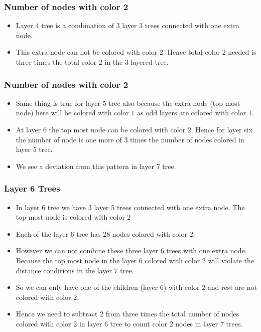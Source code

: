 \begin{frame}
    \frametitle{Number of nodes with color 2}

    \begin{itemize}
        \item Layer $4$ tree is a combination of $3$ layer $3$ trees connected with one extra node.\pause[]
        \item This extra node can not be colored with color $2$. Hence total color $2$ needed is three times the total color $2$ in the $3$ layered tree.    
    \end{itemize}

\end{frame}

\begin{frame}

    \frametitle{Number of nodes with color 2}
    
    
    \begin{itemize}
        \item Same thing is true for layer $5$ tree also because the extra node (top most node) here will be colored with color $1$ as odd layers are colored with color $1$.\pause[]
        \item At layer $6$ the top most node can be colored with color $2$. Hence for layer six the number of node is one more of $3$ times the number of nodes colored in layer $5$ tree.\pause[]
        \item We see a deviation from this pattern in layer $7$ tree.
    \end{itemize}

\end{frame}

\begin{frame}
    \frametitle{Layer 6 Trees}

    
    \begin{itemize}
        \item In layer $6$ tree we have $3$ layer $5$ trees connected with one extra node. The top most node is colored with color $2$\pause[]
        \item Each of the layer $6$ tree has $28$ nodes colored with color $2$.\pause[]
        \item However we can not combine these three layer $6$ trees with one extra node. Because the top most node in the layer $6$ colored with color $2$ will violate the distance conditions in the layer $7$ tree.\pause[]
        \item So we can only have one of the children (layer $6$) with color $2$ and rest are not colored with color $2$.\pause[]
        \item Hence we need to subtract $2$ from three times the total number of nodes colored with color $2$ in layer $6$ tree to count color $2$ nodes in layer $7$ trees.
    \end{itemize}

\end{frame}

